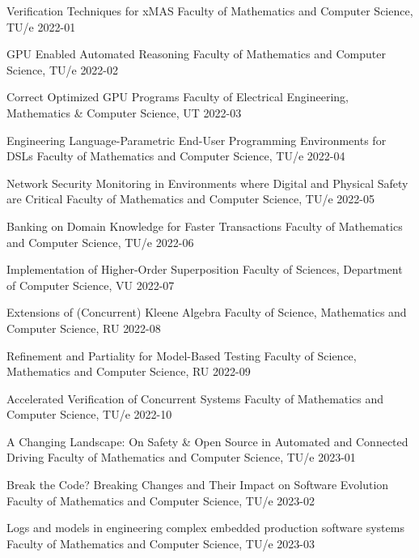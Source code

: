 \begin{multicols}{2}
         {Verification Techniques for xMAS}
         {Faculty of Mathematics and Computer Science, TU/e}
         {2022-01}

         {GPU Enabled Automated Reasoning}
         {Faculty of Mathematics and Computer Science, TU/e}
         {2022-02}

         {Correct Optimized GPU Programs}
         {Faculty of Electrical Engineering, Mathematics \& Computer Science, UT}
         {2022-03}

         {Engineering Language-Parametric End-User Programming Environments for DSLs}
         {Faculty of Mathematics and Computer Science, TU/e}
         {2022-04}

         {Network Security Monitoring in Environments where Digital and Physical Safety are Critical}
         {Faculty of Mathematics and Computer Science, TU/e}
         {2022-05}
		 
         {Banking on Domain Knowledge for Faster Transactions}
         {Faculty of Mathematics and Computer Science, TU/e}
         {2022-06}
		
         {Implementation of Higher-Order Superposition}
         {Faculty of Sciences, Department of Computer Science, VU}
         {2022-07}

         {Extensions of (Concurrent) Kleene Algebra}
         {Faculty of Science, Mathematics and Computer Science, RU}
		 {2022-08}
		 
         {Refinement and Partiality for Model-Based Testing}
         {Faculty of Science, Mathematics and Computer Science, RU}
		 {2022-09}

         {Accelerated Verification of Concurrent Systems}
         {Faculty of Mathematics and Computer Science, TU/e}
         {2022-10}
		 
         {A Changing Landscape: On Safety \& Open Source in Automated and Connected Driving}
         {Faculty of Mathematics and Computer Science, TU/e}
         {2023-01}
		 
         {Break the Code? Breaking Changes and Their Impact on Software Evolution}
         {Faculty of Mathematics and Computer Science, TU/e}
         {2023-02}

         {Logs and models in engineering complex embedded production software systems}
         {Faculty of Mathematics and Computer Science, TU/e}
         {2023-03}
		 

\end{multicols}
